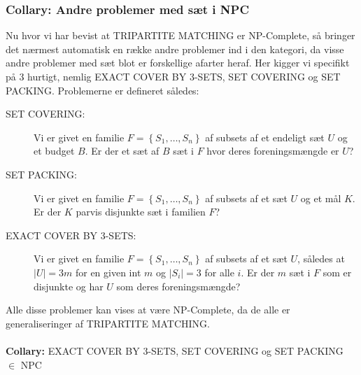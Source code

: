 \subsubsection{Collary: Andre problemer med sæt i NPC}

Nu hvor vi har bevist at TRIPARTITE MATCHING er NP-Complete, så bringer det nærmest automatisk en række andre problemer ind i den kategori, da visse andre problemer med sæt blot er forskellige afarter heraf. Her kigger vi specifikt på 3 hurtigt, nemlig EXACT COVER BY 3-SETS, SET COVERING og SET PACKING. Problemerne er defineret således:

\begin{description}
 \item[SET COVERING:] Vi er givet en familie $F = \left\lbrace S_1,\hdots,S_n \right\rbrace$ af subsets af et endeligt sæt $U$ og et budget $B$. Er der et sæt af $B$ sæt i $F$ hvor deres foreningsmængde er $U$?
 \item[SET PACKING:] Vi er givet en familie $F = \left\lbrace S_1,\hdots,S_n \right\rbrace$ af subsets af et sæt $U$ og et mål $K$. Er der $K$ parvis disjunkte sæt i familien $F$?
 \item[EXACT COVER BY 3-SETS:] Vi er givet en familie $F = \left\lbrace S_1,\hdots,S_n \right\rbrace$ af subsets af et sæt $U$, således at $|U|=3m$ for en given int $m$ og $|S_i|=3$ for alle $i$. Er der $m$ sæt i $F$ som er disjunkte og har $U$ som deres foreningsmængde?
\end{description}

Alle disse problemer kan vises at være NP-Complete, da de alle er generaliseringer af TRIPARTITE MATCHING.\\
~\\
\textbf{Collary:} EXACT COVER BY 3-SETS, SET COVERING og SET PACKING $\in$ NPC

